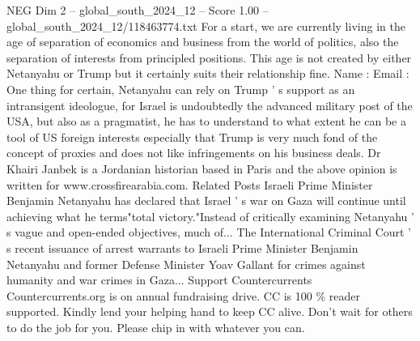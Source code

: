 \begin{textsample}{NEG Dim 2 – global\_south\_2024\_12 – Score 1.00 – global\_south\_2024\_12/118463774.txt}
For a start, we are currently living in the age of separation of economics and business from the world of politics, also the separation of interests from principled positions.
This age is not created by either Netanyahu or Trump but it certainly suits their relationship fine.
Name : Email : One thing for certain, Netanyahu can rely on Trump ' s support as an intransigent ideologue, for Israel is undoubtedly the advanced military post of the USA, but also as a pragmatist, he has to understand to what extent he can be a tool of US foreign interests especially that Trump is very much fond of the concept of proxies and does not like infringements on his business deals.
Dr Khairi Janbek is a Jordanian historian based in Paris and the above opinion is written for www.crossfirearabia.com.
Related Posts Israeli Prime Minister Benjamin Netanyahu has declared that Israel ' s war on Gaza will continue until achieving what he terms"total victory."Instead of critically examining Netanyahu ' s vague and open-ended objectives, much of...
The International Criminal Court ' s recent issuance of arrest warrants to Israeli Prime Minister Benjamin Netanyahu and former Defense Minister Yoav Gallant for crimes against humanity and war crimes in Gaza...
Support Countercurrents Countercurrents.org is on annual fundraising drive.
CC is 100 \% reader supported.
Kindly lend your helping hand to keep CC alive.
Don't wait for others to do the job for you.
Please chip in with whatever you can.

\end{textsample}

